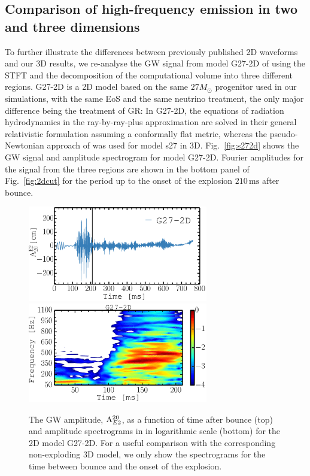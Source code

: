 \subsection{Comparison of high-frequency emission in two and three dimensions}
To further illustrate the differences between previously published 2D waveforms and our 3D results, we
re-analyse the GW signal from model G27-2D of \citet{mueller_13} using
the STFT and the decomposition of the computational volume into three
different regions. G27-2D is a 2D model based on the same $27 M_\odot$
progenitor used in our simulations, with the same EoS
and the same neutrino treatment, the only major difference being the
treatment of GR: In G27-2D, the equations of radiation hydrodynamics in
the ray-by-ray-plus approximation are solved in their general
relativistic formulation assuming a conformally flat metric, whereas
the pseudo-Newtonian approach of \citet{marek_06} was used for model s27
in 3D. Fig.~\ref{fig:s272d} shows the GW signal and amplitude spectrogram for model G27-2D.
Fourier amplitudes for the signal from the three regions are shown in the bottom panel of Fig.~\ref{fig:2dcut}
{for the period up to the onset of the explosion $210 \, \mathrm{ms}$ after bounce}.
\begin{figure}
\centering
\includegraphics[width=0.7\textwidth]{./images/paper1/fig8c.pdf} \\
\includegraphics[width=0.7\textwidth]{./images/paper1/fig8d.pdf}
\caption{The GW amplitude, $\mathrm{A}_{\mathrm\mathrm{E2}}^{\mathrm{20}}$, as a function of time after bounce (top)
and amplitude spectrograms in in logarithmic scale (bottom) for the 2D model G27-2D. 
For a useful comparison with the corresponding non-exploding 3D model, we only
show the spectrograms for the time between bounce and the onset of the explosion.
\label{fig:s272dg27}}
\end{figure}

